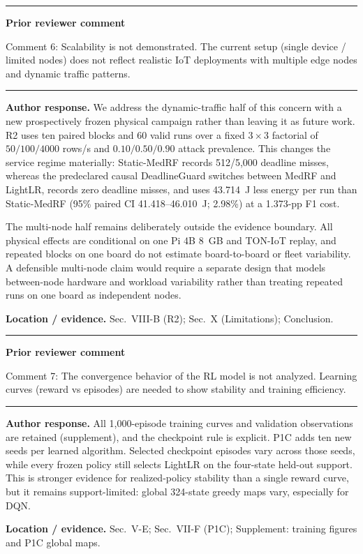 \documentclass[11pt]{article}
\newenvironment{qbox}
    {\par\vspace{4pt}\noindent\begin{minipage}{\linewidth}\rule{\linewidth}{0.4pt}\par\noindent\textbf{Prior reviewer comment}\par\noindent}
    {\par\rule{\linewidth}{0.4pt}\end{minipage}\par\vspace{4pt}}
\begin{document}
\begin{qbox}
Comment 6: Scalability is not demonstrated. The current setup (single device / limited nodes) does not reflect realistic IoT deployments with multiple edge nodes and dynamic traffic patterns.
\end{qbox}

\textbf{Author response.} We address the dynamic-traffic half of this concern with a new prospectively frozen physical campaign rather than leaving it as future work. R2 uses ten paired blocks and 60 valid runs over a fixed $3\times 3$ factorial of $50/100/4000$ rows/s and $0.10/0.50/0.90$ attack prevalence. This changes the service regime materially: Static-MedRF records 512/5{,}000 deadline misses, whereas the predeclared causal DeadlineGuard switches between MedRF and LightLR, records zero deadline misses, and uses 43.714~J less energy per run than Static-MedRF (95\% paired CI 41.418--46.010~J; 2.98\%) at a 1.373-pp F1 cost.

The multi-node half remains deliberately outside the evidence boundary. All physical effects are conditional on one Pi 4B 8~GB and TON-IoT replay, and repeated blocks on one board do not estimate board-to-board or fleet variability. A defensible multi-node claim would require a separate design that models between-node hardware and workload variability rather than treating repeated runs on one board as independent nodes.

\textbf{Location / evidence.} Sec.~VIII-B (R2); Sec.~X (Limitations); Conclusion.

\begin{qbox}
Comment 7: The convergence behavior of the RL model is not analyzed. Learning curves (reward vs episodes) are needed to show stability and training efficiency.
\end{qbox}

\textbf{Author response.} All 1{,}000-episode training curves and validation observations are retained (supplement), and the checkpoint rule is explicit. P1C adds ten new seeds per learned algorithm. Selected checkpoint episodes vary across those seeds, while every frozen policy still selects LightLR on the four-state held-out support. This is stronger evidence for realized-policy stability than a single reward curve, but it remains support-limited: global 324-state greedy maps vary, especially for DQN.

\textbf{Location / evidence.} Sec.~V-E; Sec.~VII-F (P1C); Supplement: training figures and P1C global maps.
\end{document}
